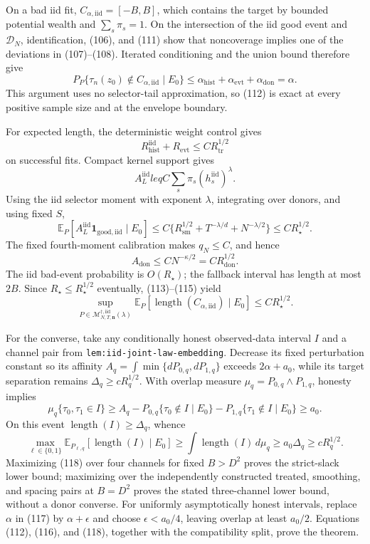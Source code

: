 On a bad iid fit, \(C_{\alpha,\mathrm{iid}}=[-B,B]\), which contains the target by bounded potential wealth and \(\sum_s\pi_s=1\).  On the intersection of the iid good event and \(\mathcal D_N\), identification, (106), and (111) show that noncoverage implies one of the deviations in (107)--(108).  Iterated conditioning and the union bound therefore give
\[
P_P\{\tau_n(z_0)\notin C_{\alpha,\mathrm{iid}}\mid E_0\}
\leq\alpha_{\mathrm{hist}}+\alpha_{\mathrm{evt}}+\alpha_{\mathrm{don}}
=\alpha.
\tag{112}
\]
This argument uses no selector-tail approximation, so (112) is exact at every positive sample size and at the envelope boundary.

For expected length, the deterministic weight control gives
\[
R_{\mathrm{hist}}^{\mathrm{iid}}+R_{\mathrm{evt}}
\leq CR_{\mathrm{tr}}^{1/2}
\tag{113}
\]
on successful fits.  Compact kernel support gives
\[
A_L^{\mathrm{iid}}leq C\sum_s\pi_s(h_s^{\mathrm{iid}})^\lambda.
\]
Using the iid selector moment with exponent \(\lambda\), integrating over donors, and using fixed \(S\),
\[
\mathbb E_P[A_L^{\mathrm{iid}}\mathbf1_{\mathrm{good,iid}}\mid E_0]
\leq C\{R_{\mathrm{sm}}^{1/2}+T^{-\lambda/d}+N^{-\lambda/2}\}
\leq CR_\star^{1/2}.
\tag{114}
\]
The fixed fourth-moment calibration makes \(q_N\leq C\), and hence
\[
A_{\mathrm{don}}\leq CN^{-\kappa/2}=CR_{\mathrm{don}}^{1/2}.
\tag{115}
\]
The iid bad-event probability is \(O(R_\star)\); the fallback interval has length at most \(2B\).  Since \(R_\star\leq R_\star^{1/2}\) eventually, (113)--(115) yield
\[
\sup_{P\in\mathcal M_{N,T,\mathbf n}^{\dagger,\mathrm{iid}}(\lambda)}
\mathbb E_P[\operatorname{length}(C_{\alpha,\mathrm{iid}})\mid E_0]
\leq CR_\star^{1/2}.
\tag{116}
\]

For the converse, take any conditionally honest observed-data interval \(I\) and a channel pair from \texttt{lem:iid-joint-law-embedding}.  Decrease its fixed perturbation constant so its affinity
\(A_q=\int\min\{dP_{0,q},dP_{1,q}\}\) exceeds \(2\alpha+a_0\), while its target separation remains \(\Delta_q\geq cR_q^{1/2}\).  With overlap measure \(\mu_q=P_{0,q}\wedge P_{1,q}\), honesty implies
\[
\mu_q\{\tau_0,\tau_1\in I\}
\geq A_q-P_{0,q}\{\tau_0\notin I\mid E_0\}
-P_{1,q}\{\tau_1\notin I\mid E_0\}
\geq a_0.
\tag{117}
\]
On this event \(\operatorname{length}(I)\geq\Delta_q\), whence
\[
\max_{\ell\in\{0,1\}}
\mathbb E_{P_{\ell,q}}[\operatorname{length}(I)\mid E_0]
\geq\int\operatorname{length}(I)\,d\mu_q
\geq a_0\Delta_q
\geq cR_q^{1/2}.
\tag{118}
\]
Maximizing (118) over four channels for fixed \(B>D^2\) proves the strict-slack lower bound; maximizing over the independently constructed treated, smoothing, and spacing pairs at \(B=D^2\) proves the stated three-channel lower bound, without a donor converse.  For uniformly asymptotically honest intervals, replace \(\alpha\) in (117) by \(\alpha+\epsilon\) and choose \(\epsilon<a_0/4\), leaving overlap at least \(a_0/2\).  Equations (112), (116), and (118), together with the compatibility split, prove the theorem.

